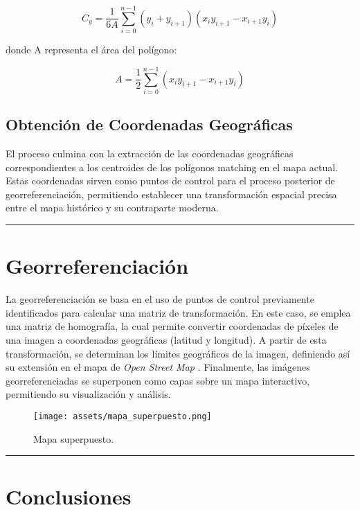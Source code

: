 \documentclass[twocolumn, fontsize=10pt]{article}
\begin{document}
\begin{equation*}
    C_y = \frac{1}{6A} \sum_{i=0}^{n-1} (y_i + y_{i+1})(x_i y_{i+1} - x_{i+1} y_i)
\end{equation*}

donde A representa el área del polígono:

\begin{equation*}
    A = \frac{1}{2} \sum_{i=0}^{n-1} (x_i y_{i+1} - x_{i+1} y_i)
\end{equation*}

\subsection{Obtención de Coordenadas Geográficas}

El proceso culmina con la extracción de las coordenadas geográficas correspondientes a los centroides de los polígonos matching en el mapa actual. Estas coordenadas sirven como puntos de control para el proceso posterior de georreferenciación, permitiendo establecer una transformación espacial precisa entre el mapa histórico y su contraparte moderna.

\rule{\linewidth}{0.5pt}
\section{Georreferenciación}

La georreferenciación se basa en el uso de puntos de control previamente identificados para calcular una matriz de transformación. En este caso, se emplea una matriz de homografía, la cual permite convertir coordenadas de píxeles de una imagen a coordenadas geográficas (latitud y longitud). A partir de esta transformación, se determinan los límites geográficos de la imagen, definiendo así su extensión en el mapa de \textit{Open Street Map} \cite{osm}. Finalmente, las imágenes georreferenciadas se superponen como capas sobre un mapa interactivo, permitiendo su visualización y análisis.

\begin{figure}[H]
    \centering
    \texttt{[image: assets/mapa\_superpuesto.png]}
    \caption{Mapa superpuesto.}
    \label{fig:poligonos_atipicos}
\end{figure}

\rule{\linewidth}{0.5pt}
\section{Conclusiones}
\end{document}
